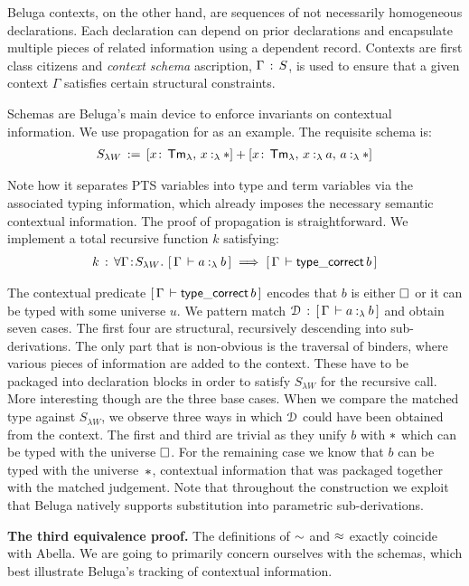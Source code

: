 Beluga contexts, on the other hand, are sequences of not necessarily homogeneous declarations.
Each declaration can depend on prior declarations and encapsulate multiple pieces of related information using a dependent record.
Contexts are first class citizens and \emph{context schema} ascription, $\Gamma \mathrel{\, : \,} S$, is used to ensure that a given context $\Gamma$ satisfies certain structural constraints.

Schemas are Beluga's main device to enforce invariants on contextual information.
We use propagation for \SysL as an example.
The requisite schema is:
\begin{align*}
  S_{\lambda W} \eqdef [x\sof\TmL \ssep \typingLh{x}{\Prp}] + [x\sof\TmL \ssep \typingLh{x}{a} \ssep \typingLh{a}{\Prp}]
\end{align*}

Note how it separates PTS variables into type and term variables via the associated typing information, which already imposes the necessary semantic contextual information.
The proof of propagation is straightforward.
We implement a total recursive function $k$ satisfying:
\begin{align*}
  k \mathrel{\, : \,} \forall \Gamma \!:\! S_{\lambda W}.\,\, [\,\Gamma\,\vdash a \mathbin{:_{\lambda}} b\,] \implies [\,\Gamma\,\vdash \mathsf{type\_correct}\,b\,]
\end{align*}

The contextual predicate $[\,\Gamma\,\vdash \mathsf{type\_correct}\,b\,]$ encodes that $b$ is either $\square$ or it can be typed with some universe $u$.
We pattern match $\mathcal{D} \mathrel{\, : \,} [\,\Gamma\,\vdash a \mathbin{:_{\lambda}} b\,]$ and obtain seven cases.
The first four are structural, recursively descending into sub-derivations.
The only part that is non-obvious is the traversal of binders, where various pieces of information are added to the context.
These have to be packaged into declaration blocks in order to satisfy $S_{\lambda W}$ for the recursive call.
More interesting though are the three base cases.
When we compare the matched type against $S_{\lambda W}$, we observe three ways in which $\mathcal{D}$ could have been obtained from the context.
The first and third are trivial as they unify $b$ with $\Prp$ which can be typed with the universe $\square$.
For the remaining case we know that $b$ can be typed with the universe~$\Prp$, contextual information that was packaged together with the matched judgement.
Note that throughout the construction we exploit that Beluga natively supports substitution into parametric sub-derivations.

{\bf The third equivalence proof.}
The definitions of $\mathrel{\sim}$ and $\mathrel{\approx}$ exactly coincide with Abella.
We are going to primarily concern ourselves with the schemas, which best illustrate Beluga's tracking of contextual information.

